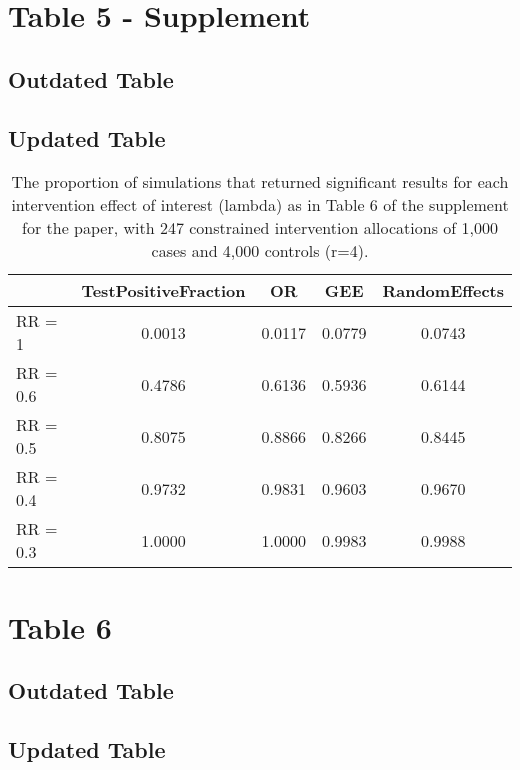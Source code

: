 \documentclass{article}\usepackage[]{graphicx}\usepackage[]{color}
\begin{document}
\FloatBarrier

\section{Table 5 - Supplement}

\subsection{Outdated Table}

\FloatBarrier

\subsection{Updated Table}


\begin{table}[ht]
\centering
\begin{tabular}{l|cccc}
  \hline
 & TestPositiveFraction & OR & GEE & RandomEffects \\ 
  \hline
RR = 1 & 0.0013 & 0.0117 & 0.0779 & 0.0743 \\ 
  RR = 0.6 & 0.4786 & 0.6136 & 0.5936 & 0.6144 \\ 
  RR = 0.5 & 0.8075 & 0.8866 & 0.8266 & 0.8445 \\ 
  RR = 0.4 & 0.9732 & 0.9831 & 0.9603 & 0.9670 \\ 
  RR = 0.3 & 1.0000 & 1.0000 & 0.9983 & 0.9988 \\ 
   \hline
\end{tabular}
\caption{The proportion of simulations that returned significant results for each intervention effect of interest (lambda) as in Table 6 of the supplement for the paper, with 247 constrained intervention allocations of 1,000 cases and 4,000 controls (r=4).} 
\end{table}



\section{Table 6}

\subsection{Outdated Table}
\FloatBarrier

\subsection{Updated Table}
\end{document}
